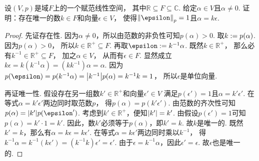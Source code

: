 \begin{example}
设\((V,p)\)是域\(F\)上的一个赋范线性空间，
其中\(\mathbb{R} \subseteq F \subseteq \mathbb{C}\).
给定\(\alpha \in V\)且\(\alpha \neq 0\).
证明：存在唯一的数\(k \in F\)和向量\(\epsilon \in V\)，
使得\(\norm{\epsilon}_p = 1\)且\(\alpha = k \epsilon\).
\begin{proof}
先证存在性.
因为\(\alpha \neq 0\)，所以由范数的非负性可知\(p(\alpha) > 0\).
取\(k := p(\alpha)\).
因为\(p(\alpha) > 0\)，
所以\(k \in \mathbb{R}^+ \subseteq F\).
再取\(\epsilon \defeq k^{-1} \alpha\).
既然\(k \in \mathbb{R}^+\)，
那么必有\(k^{-1} \in \mathbb{R}^+ \subseteq F\)，
加之\(\alpha \in V\)，
从而有\(\epsilon \in F\).
显然成立\(k \epsilon = k (k^{-1} \alpha) = (k k^{-1}) \alpha = \alpha\).
因为\(
	p(\epsilon)
	= p(k^{-1} \alpha)
	= \abs{k^{-1}} p(\alpha)  %
	= k^{-1} k
	= 1
\)，
所以\(\epsilon\)是单位向量.

再证唯一性.
假设存在另一组数\(k' \in \mathbb{R}^+\)和向量\(\epsilon' \in V\)
满足\(p(\epsilon') = 1\)且\(\alpha = k' \epsilon'\).
在等式\(\alpha = k' \epsilon'\)两边同时取范数\(p\)，
得\(p(\alpha) = p(k' \epsilon')\).
由范数的齐次性可知\(p(\alpha) = \abs{k'} p(\epsilon')\).
考虑到\(k' \in \mathbb{R}^+\)，便知\(\abs{k'} = k'\).
由假设\(p(\epsilon') = 1\)可知\(p(\alpha) = k' \cdot 1 = k'\).
因此，数\(k'\)必须等于\(p(\alpha)\)，即\(k' = k\).
故\(k\)是唯一的.
既然\(k' = k\)，那么有\(\alpha = k \epsilon = k \epsilon'\).
在等式\(\alpha = k \epsilon'\)两边同时乘以\(k^{-1}\)，
得\(k^{-1} \alpha = k^{-1} (k \epsilon') = (k^{-1} k) \epsilon' = \epsilon'\).
由于\(\epsilon = k^{-1} \alpha\)，因此\(\epsilon' = \epsilon\).
故\(\epsilon\)也是唯一的.
\end{proof}
\end{example}


